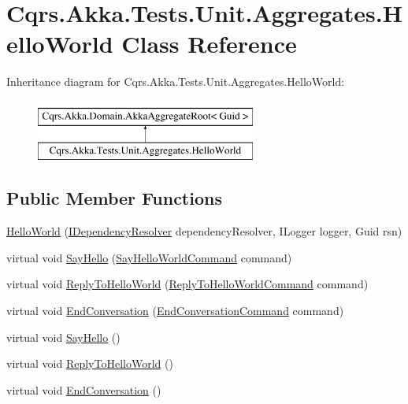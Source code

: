 \hypertarget{classCqrs_1_1Akka_1_1Tests_1_1Unit_1_1Aggregates_1_1HelloWorld}{}\section{Cqrs.\+Akka.\+Tests.\+Unit.\+Aggregates.\+Hello\+World Class Reference}
\label{classCqrs_1_1Akka_1_1Tests_1_1Unit_1_1Aggregates_1_1HelloWorld}
Inheritance diagram for Cqrs.\+Akka.\+Tests.\+Unit.\+Aggregates.\+Hello\+World\+:\begin{figure}[H]
\begin{center}
\leavevmode
\includegraphics[height=2.000000cm]{classCqrs_1_1Akka_1_1Tests_1_1Unit_1_1Aggregates_1_1HelloWorld}
\end{center}
\end{figure}
\subsection*{Public Member Functions}
\begin{DoxyCompactItemize}
\item 
\hyperlink{classCqrs_1_1Akka_1_1Tests_1_1Unit_1_1Aggregates_1_1HelloWorld_a54c9de656ea141ad532d55ba33e94a56}{Hello\+World} (\hyperlink{interfaceCqrs_1_1Configuration_1_1IDependencyResolver}{I\+Dependency\+Resolver} dependency\+Resolver, I\+Logger logger, Guid rsn)
\item 
virtual void \hyperlink{classCqrs_1_1Akka_1_1Tests_1_1Unit_1_1Aggregates_1_1HelloWorld_a20af0c54b6a45906cde151ebd20c93a5}{Say\+Hello} (\hyperlink{classCqrs_1_1Akka_1_1Tests_1_1Unit_1_1Commands_1_1SayHelloWorldCommand}{Say\+Hello\+World\+Command} command)
\item 
virtual void \hyperlink{classCqrs_1_1Akka_1_1Tests_1_1Unit_1_1Aggregates_1_1HelloWorld_a6e0f9b4297a292190a605c34741395a5}{Reply\+To\+Hello\+World} (\hyperlink{classCqrs_1_1Akka_1_1Tests_1_1Unit_1_1Commands_1_1ReplyToHelloWorldCommand}{Reply\+To\+Hello\+World\+Command} command)
\item 
virtual void \hyperlink{classCqrs_1_1Akka_1_1Tests_1_1Unit_1_1Aggregates_1_1HelloWorld_a310c79f307749813d56872b41c9685f0}{End\+Conversation} (\hyperlink{classCqrs_1_1Akka_1_1Tests_1_1Unit_1_1Commands_1_1EndConversationCommand}{End\+Conversation\+Command} command)
\item 
virtual void \hyperlink{classCqrs_1_1Akka_1_1Tests_1_1Unit_1_1Aggregates_1_1HelloWorld_a2c5e579e741dc3471e3532f5be3b98ab}{Say\+Hello} ()
\item 
virtual void \hyperlink{classCqrs_1_1Akka_1_1Tests_1_1Unit_1_1Aggregates_1_1HelloWorld_a6b3c07d040e703d89c7a065064776623}{Reply\+To\+Hello\+World} ()
\item 
virtual void \hyperlink{classCqrs_1_1Akka_1_1Tests_1_1Unit_1_1Aggregates_1_1HelloWorld_aeeb20725d192b64adf47281d37dd198d}{End\+Conversation} ()
\end{DoxyCompactItemize}
